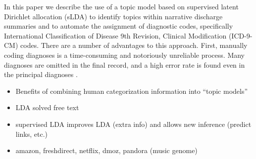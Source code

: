In this paper we describe the use of a topic model based on supervised
latent Dirichlet allocation (sLDA) to identify topics within narrative
discharge summaries and to automate the assignment of diagnostic codes,
specifically International Classification of Disease 9th Revision,
Clinical Modification (ICD-9-CM) codes. There are a number of advantages
to this approach. First, manually coding diagnoses is a time-consuming
and notoriously unreliable process. Many diagnoses are omitted in
the final record, and a high error rate is found even in the principal
diagnoses \citep{Surjan1999}.

\begin{itemize}
\item Benefits of combining human categorization information into ``topic models''
\item LDA solved free text
\item supervised LDA improves LDA (extra info) and allows new inference (predict links, etc.)
\item amazon, freshdirect, netflix, dmoz, pandora (music genome)
\end{itemize}


%


